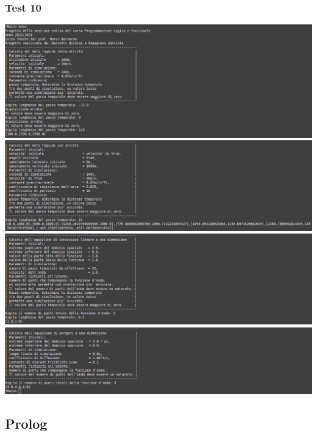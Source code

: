 \subsubsection*{Test 10}
\includegraphics[width=\textwidth,height=\textheight,keepaspectratio]{05_testing/image/hs/10_test/01_misto.png}
\\
\includegraphics[width=\textwidth,height=\textheight,keepaspectratio]{05_testing/image/hs/10_test/02_misto.png}
\\
\includegraphics[width=\textwidth,height=\textheight,keepaspectratio]{05_testing/image/hs/10_test/03_misto.png}
\\
\includegraphics[width=\textwidth,height=\textheight,keepaspectratio]{05_testing/image/hs/10_test/04_misto.png}


\subsection{Prolog}

